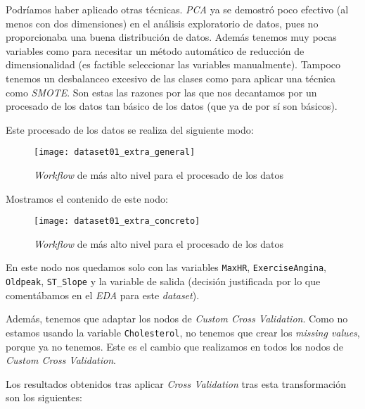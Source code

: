 \documentclass[11pt]{article}
\begin{document}
Podríamos haber aplicado otras técnicas. \emph{PCA} ya se demostró poco efectivo (al menos con dos dimensiones) en el análisis exploratorio de datos, pues no proporcionaba una buena distribución de datos. Además tenemos muy pocas variables como para necesitar un método automático de reducción de dimensionalidad (es factible seleccionar las variables manualmente). Tampoco tenemos un desbalanceo excesivo de las clases como para aplicar una técnica como \emph{SMOTE}. Son estas las razones por las que nos decantamos por un procesado de los datos tan básico de los datos (que ya de por sí son básicos).

Este procesado de los datos se realiza del siguiente modo:

\begin{figure}[H]
    \centering
    \texttt{[image: dataset01\_extra\_general]}
    \caption{\emph{Workflow} de más alto nivel para el procesado de los datos}
\end{figure}

Mostramos el contenido de este nodo:

\begin{figure}[H]
    \centering
    \texttt{[image: dataset01\_extra\_concreto]}
    \caption{\emph{Workflow} de más alto nivel para el procesado de los datos}
\end{figure}

En este nodo nos quedamos solo con las variables \lstinline{MaxHR}, \lstinline{ExerciseAngina}, \lstinline{Oldpeak}, \lstinline{ST_Slope} y la variable de salida (decisión justificada por lo que comentábamos en el \emph{EDA} para este \emph{dataset}).

Además, tenemos que adaptar los nodos de \emph{Custom Cross Validation}. Como no estamos usando la variable \lstinline{Cholesterol}, no tenemos que crear los \emph{missing values}, porque ya no tenemos. Este es el cambio que realizamos en todos los nodos de \emph{Custom Cross Validation}.

Los resultados obtenidos tras aplicar \emph{Cross Validation} tras esta transformación son los siguientes:
\end{document}
